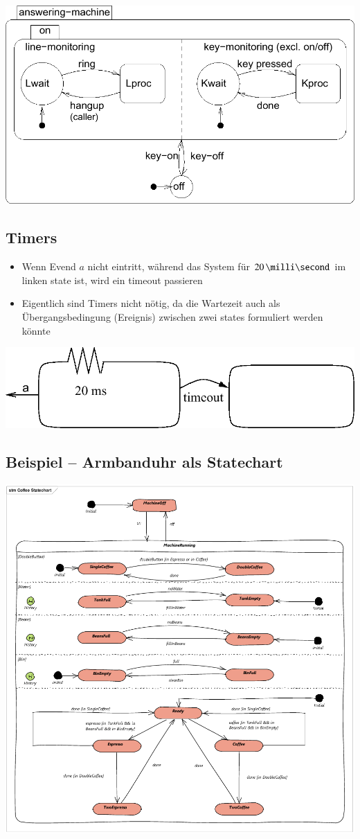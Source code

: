 \begin{center}
    \includegraphics[width=0.75\columnwidth]{images/statechart_concurrency.png}
\end{center}


\subsection{Timers}

\begin{itemize}
    \item Wenn Evend $a$ nicht eintritt, während das System für $20 \, \milli \second$ im linken state ist, wird ein timeout passieren
    \item Eigentlich sind Timers nicht nötig, da die Wartezeit auch als Übergangsbedingung (Ereignis) zwischen zwei states formuliert werden könnte
\end{itemize}

\begin{center}
    \includegraphics[width=0.65\columnwidth]{images/statechart_timers.png}
\end{center}


\subsection{Beispiel -- Armbanduhr als Statechart}

\begin{center}
    \includegraphics[width=0.8\columnwidth]{images/statechart_example_coffeemachine.pdf}
\end{center}

